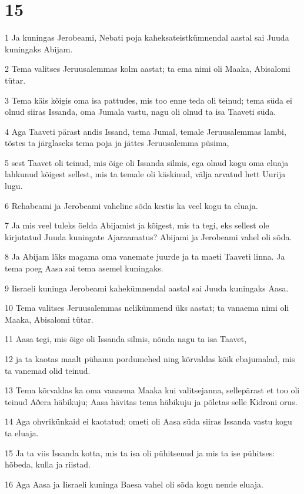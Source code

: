 \chapter{15}

\par 1 Ja kuningas Jerobeami, Nebati poja kaheksateistkümnendal aastal sai Juuda kuningaks Abijam.
\par 2 Tema valitses Jeruusalemmas kolm aastat; ta ema nimi oli Maaka, Abisalomi tütar.
\par 3 Tema käis kõigis oma isa pattudes, mis too enne teda oli teinud; tema süda ei olnud siiras Issanda, oma Jumala vastu, nagu oli olnud ta isa Taaveti süda.
\par 4 Aga Taaveti pärast andis Issand, tema Jumal, temale Jeruusalemmas lambi, tõstes ta järglaseks tema poja ja jättes Jeruusalemma püsima,
\par 5 sest Taavet oli teinud, mis õige oli Issanda silmis, ega olnud kogu oma eluaja lahkunud kõigest sellest, mis ta temale oli käskinud, välja arvatud hett Uurija lugu.
\par 6 Rehabeami ja Jerobeami vaheline sõda kestis ka veel kogu ta eluaja.
\par 7 Ja mis veel tuleks öelda Abijamist ja kõigest, mis ta tegi, eks sellest ole kirjutatud Juuda kuningate Ajaraamatus? Abijami ja Jerobeami vahel oli sõda.
\par 8 Ja Abijam läks magama oma vanemate juurde ja ta maeti Taaveti linna. Ja tema poeg Aasa sai tema asemel kuningaks.
\par 9 Iisraeli kuninga Jerobeami kahekümnendal aastal sai Juuda kuningaks Aasa.
\par 10 Tema valitses Jeruusalemmas nelikümmend üks aastat; ta vanaema nimi oli Maaka, Abisalomi tütar.
\par 11 Aasa tegi, mis õige oli Issanda silmis, nõnda nagu ta isa Taavet,
\par 12 ja ta kaotas maalt pühamu pordumehed ning kõrvaldas kõik ebajumalad, mis ta vanemad olid teinud.
\par 13 Tema kõrvaldas ka oma vanaema Maaka kui valitsejanna, sellepärast et too oli teinud Aðera häbikuju; Aasa hävitas tema häbikuju ja põletas selle Kidroni orus.
\par 14 Aga ohvrikünkaid ei kaotatud; ometi oli Aasa süda siiras Issanda vastu kogu ta eluaja.
\par 15 Ja ta viis Issanda kotta, mis ta isa oli pühitsenud ja mis ta ise pühitses: hõbeda, kulla ja riistad.
\par 16 Aga Aasa ja Iisraeli kuninga Baesa vahel oli sõda kogu nende eluaja.
